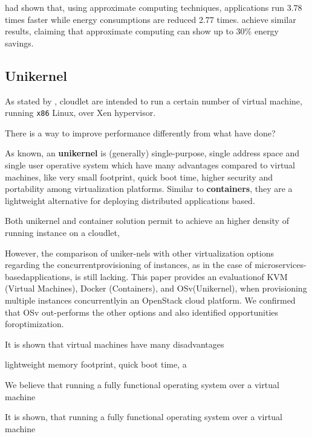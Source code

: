 \documentclass[sigchi]{acmart}
\begin{document}
\cite{ApproximateComputingArticle} had shown that, using approximate computing techniques, applications run 3.78 times faster while energy consumptions are reduced 2.77 times. \citet{ImpactApproximation} achieve similar results, claiming that approximate computing can show up to 30\% energy savings.

\subsection{Unikernel}

As stated by \citet{MSAReport}, cloudlet are intended to run a certain number of virtual machine, running \texttt{x86} Linux, over Xen hypervisor. 

There is a way to improve performance differently from what \citep{MSAReport} have done? 

As known, an \textbf{unikernel} is (generally) single-purpose, single address space and single user operative system which have many advantages compared to virtual machines, like very small footprint, quick boot time, higher security and portability among virtualization platforms. Similar to \textbf{containers}, they are  a  lightweight  alternative  for  deploying  distributed  applications based. 

Both unikernel and container solution permit to achieve an higher density of running instance on a cloudlet, 


However, the comparison of uniker-nels  with  other  virtualization  options  regarding  the  concurrentprovisioning  of  instances,  as  in  the  case  of  microservices-basedapplications,  is  still  lacking.  This  paper  provides  an  evaluationof   KVM   (Virtual   Machines),  Docker   (Containers),  and   OSv(Unikernel),  when  provisioning  multiple  instances  concurrentlyin  an  OpenStack  cloud  platform.  We  confirmed  that  OSv  out-performs  the other  options and  also  identified opportunities foroptimization.







It is shown that virtual machines have many disadvantages 


lightweight memory footprint, quick boot time, a



We believe that running a fully functional operating system over a virtual machine  


It is shown, that running a fully functional operating system over a virtual machine 
\end{document}

